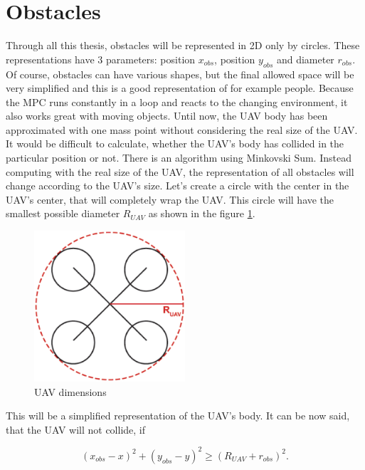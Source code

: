 \documentclass{article}
\begin{document}
\section{Obstacles}
Through all this thesis, obstacles will be represented in 2D only by circles. These representations have 3 parameters: position $x_{obs}$, position $y_{obs}$ and diameter $r_{obs}$. Of course, obstacles can have various shapes, but the final allowed space will be very simplified and this is a good representation of for example people. Because the MPC runs constantly in a loop and reacts to the changing environment, it also works great with moving objects. Until now, the UAV body has been approximated with one mass point without considering the real size of the UAV. It would be difficult to calculate, whether the UAV's body has collided in the particular position or not. There is an algorithm using Minkovski Sum. Instead computing with the real size of the UAV, the representation of all obstacles will change according to the UAV's size.
Let's create a circle with the center in the UAV's center, that will completely wrap the UAV. This circle will have the smallest possible diameter $R_{UAV}$ as shown in the figure \ref{fig:UAV_dimensions}. 

\begin{figure}[h]
\begin{center}
\includegraphics[width=0.5\textwidth]{fig/UAV_dimensions.eps} 
\caption{UAV dimensions}
\label{fig:UAV_dimensions}
\end{center}
\end{figure}

This will be a simplified representation of the UAV's body. It can be now said, that the UAV will not collide, if 

\begin{equation}
(x_{obs} - x)^2 + (y_{obs} - y)^2 \geq (R_{UAV} + r_{obs})^2.
\end{equation}
\end{document}
